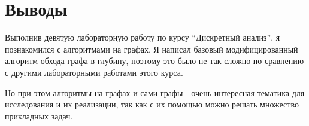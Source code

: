  
\section{Выводы}
Выполнив девятую лабораторную работу по курсу \enquote{Дискретный анализ}, я познакомился с алгоритмами на графах. Я написал базовый модифицированный алгоритм обхода графа в глубину, поэтому это было не так сложно по сравнению с другими лабораторными работами этого курса.

Но при этом алгоритмы на графах и сами графы - очень интересная тематика для исследования и их реализации, так как с их помощью можно решать множество прикладных задач.
\pagebreak